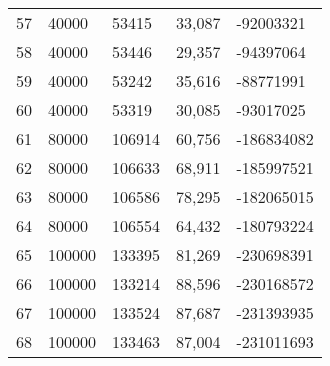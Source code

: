\begin{longtable}{lllll}
    57               & 40000          & 53415          & 33,087      & -92003321       \\
    58               & 40000          & 53446          & 29,357      & -94397064       \\
    59               & 40000          & 53242          & 35,616      & -88771991       \\
    60               & 40000          & 53319          & 30,085      & -93017025       \\
    61               & 80000          & 106914         & 60,756      & -186834082      \\
    62               & 80000          & 106633         & 68,911      & -185997521      \\
    63               & 80000          & 106586         & 78,295      & -182065015      \\
    64               & 80000          & 106554         & 64,432      & -180793224      \\
    65               & 100000         & 133395         & 81,269      & -230698391      \\
    66               & 100000         & 133214         & 88,596      & -230168572      \\
    67               & 100000         & 133524         & 87,687      & -231393935      \\
    68               & 100000         & 133463         & 87,004      & -231011693      
\end{longtable}


